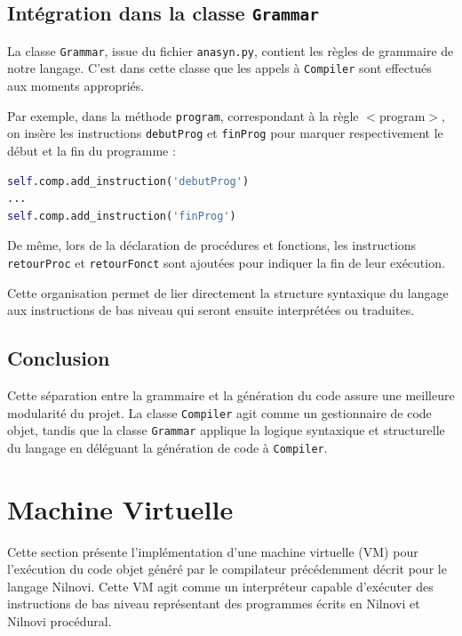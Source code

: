 \documentclass[a4paper, 12pt]{article}
\begin{document}
    \subsection{Intégration dans la classe \texttt{Grammar}}

    La classe \texttt{Grammar}, issue du fichier \texttt{anasyn.py}, contient les règles de grammaire de notre langage. C’est dans cette classe que les appels à \texttt{Compiler} sont effectués aux moments appropriés.

    Par exemple, dans la méthode \texttt{program}, correspondant à la règle $<$program$>$, on insère les instructions \texttt{debutProg} et \texttt{finProg} pour marquer respectivement le début et la fin du programme :

    \begin{lstlisting}[language=python, xleftmargin=20pt]
self.comp.add_instruction('debutProg')
...
self.comp.add_instruction('finProg') \end{lstlisting}

    De même, lors de la déclaration de procédures et fonctions, les instructions \texttt{retourProc} et \texttt{retourFonct} sont ajoutées pour indiquer la fin de leur exécution.

    Cette organisation permet de lier directement la structure syntaxique du langage aux instructions de bas niveau qui seront ensuite interprétées ou traduites.

    \subsection{Conclusion}

    Cette séparation entre la grammaire et la génération du code assure une meilleure modularité du projet. La classe \texttt{Compiler} agit comme un gestionnaire de code objet, tandis que la classe \texttt{Grammar} applique la logique syntaxique et structurelle du langage en déléguant la génération de code à \texttt{Compiler}.

    \newpage

    \section{Machine Virtuelle}

    Cette section présente l'implémentation d'une machine virtuelle (VM) pour l'exécution du code objet généré par le compilateur précédemment décrit pour le langage Nilnovi. Cette VM agit comme un interpréteur capable d'exécuter des instructions de bas niveau représentant des programmes écrits en Nilnovi et Nilnovi procédural.
\end{document}
